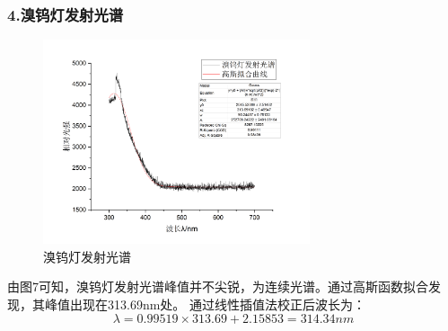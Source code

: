 \documentclass[12pt,a4paper,UTF8]{ctexart}
\begin{document}
\subsubsection*{4.溴钨灯发射光谱}
\begin{figure}[htbp]
	\centering
	\includegraphics[width=0.7\textwidth]{img//BrWReg.png}
	\caption{溴钨灯发射光谱}
	\label{fig:7}
\end{figure}

由图7可知，溴钨灯发射光谱峰值并不尖锐，为连续光谱。通过高斯函数拟合发现，其峰值出现在313.69nm处。
通过线性插值法校正后波长为：
\begin{equation*}
	\lambda=0.99519\times313.69+2.15853=314.34nm
\end{equation*}
\end{document}
